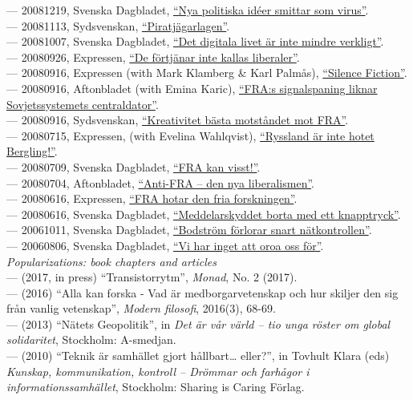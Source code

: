 \documentclass[a4paper,11pt,oneside]{article}
\begin{document}
{  --- 20081219, Svenska Dagbladet, \href{}{``Nya politiska idéer smittar som virus''}. \\
  --- 20081113, Sydsvenskan, \href{http://www.sydsvenskan.se/2008-11-12/piratjagarlagen}{``Piratjägarlagen''}. \\
  --- 20081007, Svenska Dagbladet, \href{http://www.svd.se/det-digitala-livet-ar-inte-mindre-verkligt}{``Det digitala livet är inte mindre verkligt''}. \\
  --- 20080926, Expressen, \href{}{``De förtjänar inte kallas liberaler''}. \\
  --- 20080916, Expressen (with Mark Klamberg \& Karl Palmås), \href{http://www.expressen.se/kultur/silence-fiction/}{``Silence Fiction''}. \\
  --- 20080916, Aftonbladet (with Emina Karic), \href{}{``FRA:s signalspaning liknar Sovjetssystemets centraldator''}. \\
  --- 20080916, Sydsvenskan, \href{}{``Kreativitet bästa motståndet mot FRA''}. \\
  --- 20080715, Expressen, (with Evelina Wahlqvist), \href{http://www.expressen.se/debatt/ryssland-ar-inte-hotet-bergling/}{``Ryssland är inte hotet Bergling!''}. \\
  --- 20080709, Svenska Dagbladet, \href{http://www.svd.se/fra-kan-visst}{``FRA kan visst!''}. \\
  --- 20080704, Aftonbladet, \href{}{``Anti-FRA – den nya liberalismen''}. \\
  --- 20080616, Expressen, \href{http://www.expressen.se/debatt/fra-lagen-hindrar-fria-forskningen/}{``FRA hotar den fria forskningen''}. \\
  --- 20080616, Svenska Dagbladet, \href{http://www.svd.se/meddelarskyddet-bort-med-ett-knapptryck}{``Meddelarskyddet borta med ett knapptryck''}. \\
  --- 20061011, Svenska Dagbladet, \href{http://www.svd.se/bodstrom-forlorar-snart-natkontrollen}{``Bodström förlorar snart nätkontrollen''}. \\
  --- 20060806, Svenska Dagbladet,  \href{http://www.svd.se/vi-har-inget-att-oroa-oss-for}{``Vi har inget att oroa oss för''}. \\



   \noindent \emph{Popularizations: book chapters and articles}\\
     --- (2017, in press) ``Transistorrytm'', \emph{Monad}, No. 2 (2017). \\
     --- (2016) ``Alla kan forska - Vad är medborgarvetenskap och hur skiljer den sig från vanlig vetenskap'', \emph{Modern filosofi}, 2016(3), 68-69. \\
     --- (2013) ``Nätets Geopolitik'', in \emph{Det är vår värld – tio unga röster om global solidaritet}, Stockholm: A-smedjan.\\
     --- (2010) ``Teknik är samhället gjort hållbart… eller?'', in Tovhult Klara (eds) \emph{Kunskap, kommunikation, kontroll – Drömmar och farhågor i informationssamhället}, Stockholm: Sharing is Caring Förlag. \\

}
\end{document}
